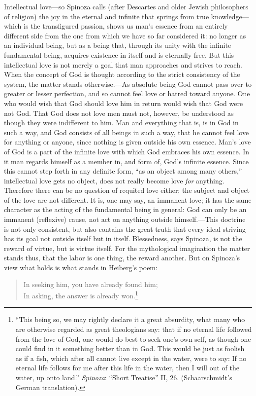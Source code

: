 \documentclass[12pt]{book}
\newcommand{\opage}[1]{\marginnote{\footnotesize\textit{[#1]}}}
\begin{document}
Intellectual love---so Spinoza calls (after Descartes and older Jewish philosophers of
religion) the joy in the eternal and infinite that springs from true knowledge---which is
the transfigured passion, shows us man's essence from an entirely different side from the
one from which we have so far considered it: no longer as an individual being, but as a
being that, through its unity with the infinite fundamental being, acquires existence in
itself and is eternally free. But this intellectual love is not merely a goal that man
approaches and strives to reach. When the concept of God is thought according to the
strict consistency of the system, the matter stands otherwise.---As absolute being God
cannot pass over to greater or lesser perfection, and so cannot feel love or hatred
toward anyone. One who would wish that God should love him in return would wish that God
were not God. That God does not love men must not, however, be understood as though they
were indifferent to him. Man and everything that is, is in God in such a way, and God
consists of all beings in such a way, that he cannot \opage{141}feel love for anything
or anyone, since nothing is given outside his own essence. Man's love of God is a part of
the infinite love with which God embraces his own essence. In it man regards himself as a
member in, and form of, God's infinite essence. Since this cannot step forth in any
definite form, ``as an object among many others,'' intellectual love gets no object, does
not really become love \emph{for} anything. Therefore there can be no question of
requited love either; the subject and object of the love are not different. It is, one
may say, an immanent love; it has the same character as the acting of the fundamental
being in general: God can only be an immanent (reflexive) cause, not act on anything
outside himself.---This doctrine is not only consistent, but also contains the great
truth that every ideal striving has its goal not outside itself but in itself.
Blessedness, says Spinoza, is not the reward of virtue, but is virtue itself. For the
mythological imagination the matter stands thus, that the labor is one thing, the reward
another. But on Spinoza's view what holds is what stands in Heiberg's %
poem:
\begin{quote}
In seeking him, you have already found him;\\
In asking, the answer is already won.\footnote{``This being so, we may rightly declare it
a great absurdity, what many who are otherwise regarded as great theologians say: that
if no eternal life followed from the love of God, one would do best to seek one's own
self, as though one could find in it something better than in God. This would be just as
foolish as if a fish, which after all cannot live except in the water, were to say: If
no eternal life follows for me after this life in the water, then I will out of the
water, up onto land.'' \emph{Spinoza}: ``Short Treatise'' II, 26. (Schaarschmidt's
German translation).}
\end{quote}
\end{document}
